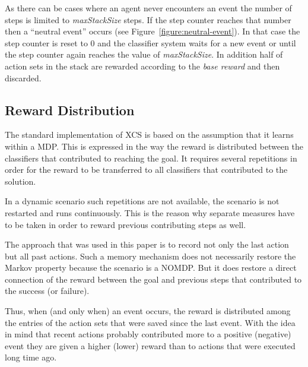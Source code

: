 As there can be cases where an agent never encounters an event the number of steps is limited to \emph{maxStackSize} steps. If the step counter reaches that number then a ``neutral event'' occurs (see Figure~\ref{figure:neutral-event}). In that case the step counter is reset to $0$ and the classifier system waits for a new event or until the step counter again reaches the value of \emph{maxStackSize}. In addition half of action sets in the stack are rewarded according to the \emph{base reward} and then discarded.


\subsection{Reward Distribution}
\label{subsection:reward-distribution}

The standard implementation of XCS is based on the assumption that it learns within a MDP. This is expressed in the way the reward is distributed between the classifiers that contributed to reaching the goal. It requires several repetitions in order for the reward to be transferred to all classifiers that contributed to the solution.

In a dynamic scenario such repetitions are not available, the scenario is not restarted and runs continuously. This is the reason why separate measures have to be taken in order to reward previous contributing steps as well.

The approach that was used in this paper is to record not only the last action but all past actions. Such a memory mechanism does not necessarily restore the Markov property because the scenario is a NOMDP. But it does restore a direct connection of the reward between the goal and previous steps that contributed to the success (or failure).

Thus, when (and only when) an event occurs, the reward is distributed among the entries of the action sets that were saved since the last event. With the idea in mind that recent actions probably contributed more to a positive (negative) event they are given a higher (lower) reward than to actions that were executed long time ago. 

